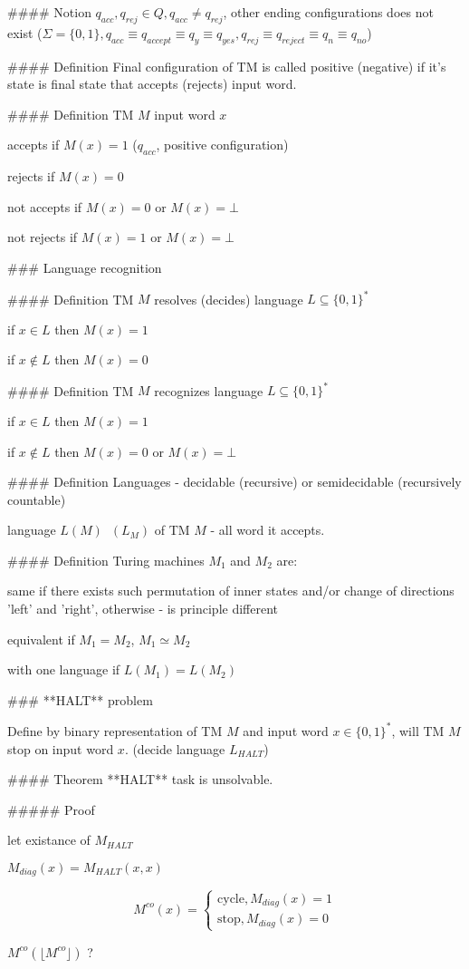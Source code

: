 \documentclass[12pt,letterpaper]{report}
\begin{document}
#### Notion
$q_{acc}, q_{rej} \in Q, q_{acc} \not= q_{rej}$, other ending configurations does not exist
($\Sigma = \{0,1\}, q_{acc} \equiv q_{accept} \equiv q_y \equiv q_{yes}, q_{rej} \equiv q_{reject} \equiv q_{n} \equiv q_{no}$)

#### Definition
Final configuration of TM is called positive (negative) if it's state is final state that accepts (rejects) input word.

#### Definition
TM $M$ input word $x$
\item accepts if $M(x) = 1$ ($q_{acc}$, positive configuration)
\item rejects if $M(x) = 0$
\item not  accepts if $M(x) = 0$ or $M(x) = \bot$
\item not rejects if $M(x) = 1$ or $M(x) = \bot$

### Language recognition

#### Definition
TM $M$ resolves (decides) language $L \subseteq \{0,1\}^*$
\item if $x \in L$ then $M(x) = 1$
\item if $x \not\in L$ then $M(x) = 0$

#### Definition
TM $M$ recognizes language $L \subseteq \{0,1\}^*$
\item if $x \in L$ then $M(x) = 1$
\item if $x \not\in L$ then $M(x) = 0$ or $M(x) = \bot$

#### Definition
Languages - decidable (recursive) or semidecidable (recursively countable)

language $L(M) \;\; (L_M)$ of TM $M$ - all word it accepts.

#### Definition
Turing machines $M_1$ and $M_2$ are:
\item same if there exists such permutation of inner states and/or change of directions 'left' and 'right', otherwise - is principle different
\item equivalent if $M_1 = M_2$, $M_1 \simeq M_2$
\item with one language if $L(M_1) = L(M_2)$

### **HALT** problem

Define by binary representation of TM $M$ and input word $x \in \{0,1\}^*$, will TM $M$ stop on input word $x$. (decide language $L_{HALT}$)

#### Theorem
**HALT** task is unsolvable.

##### Proof
\item let existance of $M_{HALT}$
\item $M_{diag}(x) = M_{HALT}(x, x)$
\item $$M^{co}(x) = \begin{cases}
\text{cycle}, M_{diag}(x) = 1 \\
\text{stop}, M_{diag}(x) = 0
\end{cases}$$
\item $M^{co}(\lfloor M^{co} \rfloor)$ ?
\end{document}
